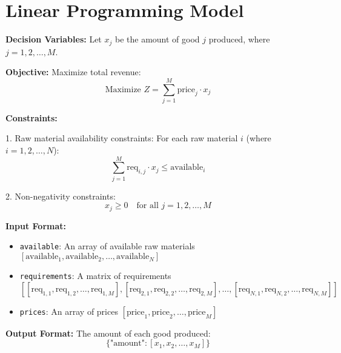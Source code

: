 \documentclass{article}
\begin{document}
\section*{Linear Programming Model}

\textbf{Decision Variables:}
Let \( x_j \) be the amount of good \( j \) produced, where \( j = 1, 2, \ldots, M \).

\textbf{Objective:}
Maximize total revenue:
\[
\text{Maximize } Z = \sum_{j=1}^{M} \text{price}_j \cdot x_j
\]

\textbf{Constraints:}

1. Raw material availability constraints:
For each raw material \( i \) (where \( i = 1, 2, \ldots, N \)):
\[
\sum_{j=1}^{M} \text{req}_{i,j} \cdot x_j \leq \text{available}_i
\]

2. Non-negativity constraints:
\[
x_j \geq 0 \quad \text{for all } j = 1, 2, \ldots, M
\]

\textbf{Input Format:}

\begin{itemize}
    \item \texttt{available}: An array of available raw materials \([ \text{available}_1, \text{available}_2, \ldots, \text{available}_N ]\)
    \item \texttt{requirements}: A matrix of requirements \([ [ \text{req}_{1,1}, \text{req}_{1,2}, \ldots, \text{req}_{1,M} ], [ \text{req}_{2,1}, \text{req}_{2,2}, \ldots, \text{req}_{2,M} ], \ldots, [ \text{req}_{N,1}, \text{req}_{N,2}, \ldots, \text{req}_{N,M} ] ]\)
    \item \texttt{prices}: An array of prices \([ \text{price}_1, \text{price}_2, \ldots, \text{price}_M ]\)
\end{itemize}

\textbf{Output Format:}
The amount of each good produced:
\[
\{
    \text{"amount"}: [x_1, x_2, \ldots, x_M]
\}
\]
\end{document}
